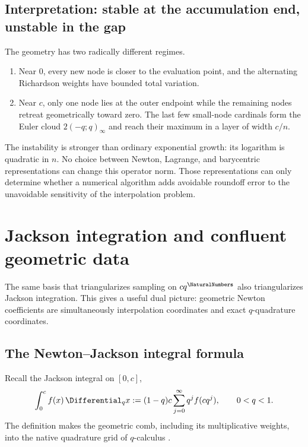 \subsection{Interpretation: stable at the accumulation end, unstable in the gap}

The geometry has two radically different regimes.

\begin{enumerate}
\item Near $0$, every new node is closer to the evaluation point, and the
      alternating Richardson weights have bounded total variation.
\item Near $c$, only one node lies at the outer endpoint while the remaining
      nodes retreat geometrically toward zero.  The last few small-node
      cardinals form the Euler cloud $2(-q;q)_\infty$ and reach their maximum
      in a layer of width $c/n$.
\end{enumerate}

The instability is stronger than ordinary exponential growth: its logarithm
is quadratic in $n$.  No choice between Newton, Lagrange, and barycentric
representations can change this operator norm.  Those representations can
only determine whether a numerical algorithm adds avoidable roundoff error
to the unavoidable sensitivity of the interpolation problem.

\section{Jackson integration and confluent geometric data}
\label{gq:chap:jackson-hermite}

The same basis that triangularizes sampling on $cq^{\NaturalNumbers}$ also
triangularizes Jackson integration.  This gives a useful dual picture:
geometric Newton coefficients are simultaneously interpolation coordinates
and exact $q$-quadrature coordinates.

\subsection{The Newton--Jackson integral formula}

Recall the Jackson integral on $[0,c]$,
\begin{equation}
 \int_0^c f(x)\,\Differential_qx
 :=(1-q)c\sum_{j=0}^{\infty}q^j f(cq^j),
 \qquad 0<q<1.
 \label{gq:eq:jackson-definition}
\end{equation}
The definition makes the geometric comb, including its multiplicative
weights, into the native quadrature grid of $q$-calculus
\cite{KacCheung2002,DLMF17}.

